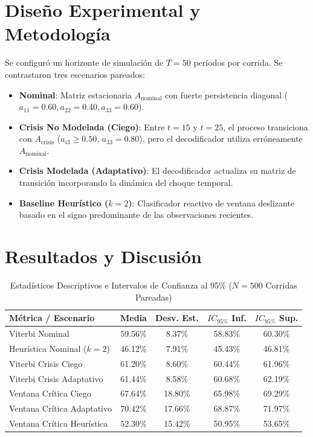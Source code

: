 \documentclass[conference,10pt,twocolumn]{IEEEtran}
\begin{document}
\section{Diseño Experimental y Metodología}
Se configuró un horizonte de simulación de $T=50$ períodos por corrida. Se contrastaron tres escenarios pareados:
\begin{itemize}
    \item \textbf{Nominal}: Matriz estacionaria $A_{\text{nominal}}$ con fuerte persistencia diagonal ($a_{11}=0.60, a_{22}=0.40, a_{33}=0.60$).
    \item \textbf{Crisis No Modelada (Ciego)}: Entre $t=15$ y $t=25$, el proceso transiciona con $A_{\text{crisis}}$ ($a_{i3} \ge 0.50$, $a_{33}=0.80$), pero el decodificador utiliza erróneamente $A_{\text{nominal}}$.
    \item \textbf{Crisis Modelada (Adaptativo)}: El decodificador actualiza su matriz de transición incorporando la dinámica del choque temporal.
    \item \textbf{Baseline Heurístico ($k=2$)}: Clasificador reactivo de ventana deslizante basado en el signo predominante de las observaciones recientes.
\end{itemize}

\section{Resultados y Discusión}

\begin{table}[htbp]
\caption{Estadísticos Descriptivos e Intervalos de Confianza al 95\% ($N=500$ Corridas Pareadas)}
\label{tab:resumen}
\centering
\begin{tabular}{lcccc}
\toprule
\textbf{Métrica / Escenario} & \textbf{Media} & \textbf{Desv. Est.} & \textbf{$IC_{95\%}$ Inf.} & \textbf{$IC_{95\%}$ Sup.} \\
\midrule
Viterbi Nominal & 59.56\% & 8.37\% & 58.83\% & 60.30\% \\
Heurística Nominal ($k=2$) & 46.12\% & 7.91\% & 45.43\% & 46.81\% \\
Viterbi Crisis Ciego & 61.20\% & 8.60\% & 60.44\% & 61.96\% \\
Viterbi Crisis Adaptativo & 61.44\% & 8.58\% & 60.68\% & 62.19\% \\
Ventana Crítica Ciego & 67.64\% & 18.80\% & 65.98\% & 69.29\% \\
Ventana Crítica Adaptativo & 70.42\% & 17.66\% & 68.87\% & 71.97\% \\
Ventana Crítica Heurística & 52.30\% & 15.42\% & 50.95\% & 53.65\% \\
\bottomrule
\end{tabular}
\end{table}
\end{document}
